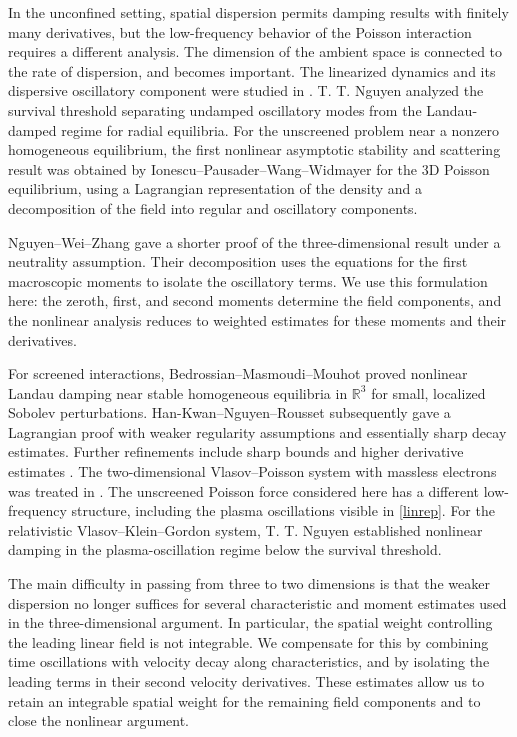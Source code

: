 \documentclass[reqno,11pt]{amsart}
\numberwithin{equation}{section}
\def\R{{\mathbb R}}
\def\R{{\bf R}}
\def\R{\mathbb{R}}
\begin{document}
In the unconfined setting, spatial dispersion permits damping results
with finitely many derivatives, but the low-frequency behavior of the
Poisson interaction requires a different analysis. The dimension of the ambient space is connected to the rate of dispersion, and becomes important.
The linearized dynamics and its dispersive oscillatory component
were studied in \cite{HNRcmp,JBedrossian2020}. T. T. Nguyen
\cite{NguyenSurvival} analyzed the survival threshold separating
undamped oscillatory modes from the Landau-damped regime for radial
equilibria. For the unscreened problem near a nonzero homogeneous equilibrium,
the first nonlinear asymptotic stability and scattering result was obtained by
Ionescu--Pausader--Wang--Widmayer \cite{AIonescu2022} for the 3D Poisson equilibrium, using a
Lagrangian representation of the density and a decomposition of the
field into regular and oscillatory components.

Nguyen--Wei--Zhang \cite{NWZ2024} gave a shorter proof of the
three-dimensional result under a neutrality assumption. Their
decomposition uses the equations for the first macroscopic moments
to isolate the oscillatory terms. We use this formulation here:
the zeroth, first, and second moments determine the field components,
and the nonlinear analysis reduces to weighted estimates for these
moments and their derivatives.

For screened interactions, Bedrossian--Masmoudi--Mouhot
\cite{BMMscreened2018} proved nonlinear Landau damping near stable
homogeneous equilibria in $\R^3$ for small, localized Sobolev
perturbations. Han-Kwan--Nguyen--Rousset \cite{HanKwanD2021}
subsequently gave a Lagrangian proof with weaker regularity
assumptions and essentially sharp decay estimates. Further
refinements include sharp bounds \cite{HNX1} and higher derivative
estimates \cite{NguyenTT2020t}. The two-dimensional Vlasov--Poisson system with massless electrons was treated in \cite{HNX2}. The unscreened
Poisson force considered here has a different low-frequency structure,
including the plasma oscillations visible in \eqref{linrep}.
For the relativistic Vlasov--Klein--Gordon system, T. T. Nguyen
\cite{NguyenBelow} established nonlinear damping in the
plasma-oscillation regime below the survival threshold.

The main difficulty in passing from three to two dimensions is that
the weaker dispersion no longer suffices for several characteristic
and moment estimates used in the three-dimensional argument.
In particular, the spatial weight controlling the leading linear
field is not integrable. We compensate for this by combining time
oscillations with velocity decay along characteristics, and by
isolating the leading terms in their second velocity derivatives.
These estimates allow us to retain an integrable spatial weight for
the remaining field components and to close the nonlinear argument.
\end{document}
